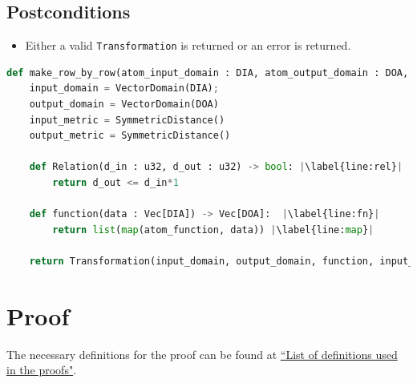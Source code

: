 \documentclass[11pt,a4paper]{article}
\begin{document}
\subsection*{Postconditions}
\begin{itemize}
    \item Either a valid \texttt{Transformation} is returned or an error is returned.
\end{itemize}


\begin{lstlisting}[language=Python, escapechar=|]
def make_row_by_row(atom_input_domain : DIA, atom_output_domain : DOA, atom_function : F):
    input_domain = VectorDomain(DIA);
    output_domain = VectorDomain(DOA)
    input_metric = SymmetricDistance()
    output_metric = SymmetricDistance()

    def Relation(d_in : u32, d_out : u32) -> bool: |\label{line:rel}|
        return d_out <= d_in*1
    
    def function(data : Vec[DIA]) -> Vec[DOA]:  |\label{line:fn}|
        return list(map(atom_function, data)) |\label{line:map}|
    
    return Transformation(input_domain, output_domain, function, input_metric, output_metric, stability_relation=Relation)

\end{lstlisting}


\section{Proof}
The necessary definitions for the proof can be found at \href{https://www.overleaf.com/project/60d214e390b337703d200982}{``List of definitions used in the proofs"}.
\end{document}
